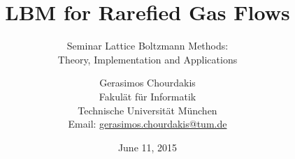 \documentclass[a4paper,pdftex]{scrartcl}
\begin{document}
\title{LBM for Rarefied Gas Flows}
\subtitle{Seminar Lattice Boltzmann Methods:\\Theory, Implementation and Applications}
\date{June 11, 2015}
\author{
Gerasimos Chourdakis\\
Fakul\"at f\"ur Informatik\\Technische Universit\"at M\"unchen\\
Email: \href{mailto:gerasimos.chourdakis@tum.de}{gerasimos.chourdakis@tum.de} 
}

\maketitle

\thispagestyle{empty}


















\nocite{*}



\end{document}
